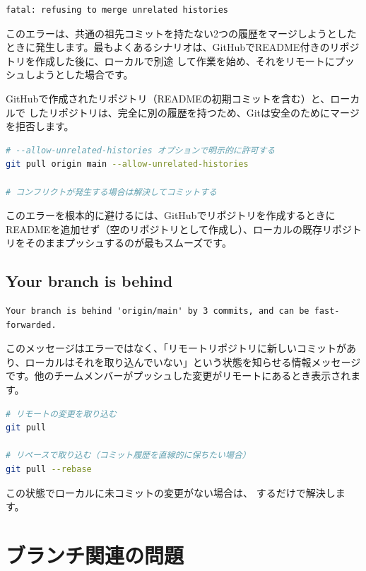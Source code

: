 \begin{lstlisting}[language={}]
fatal: refusing to merge unrelated histories
\end{lstlisting}

このエラーは、共通の祖先コミットを持たない2つの履歴をマージしようとしたときに発生します。最もよくあるシナリオは、GitHubでREADME付きのリポジトリを作成した後に、ローカルで別途  して作業を始め、それをリモートにプッシュしようとした場合です。

GitHubで作成されたリポジトリ（READMEの初期コミットを含む）と、ローカルで  したリポジトリは、完全に別の履歴を持つため、Gitは安全のためにマージを拒否します。

\begin{lstlisting}[language=bash]
# --allow-unrelated-histories オプションで明示的に許可する
git pull origin main --allow-unrelated-histories

# コンフリクトが発生する場合は解決してコミットする
\end{lstlisting}

このエラーを根本的に避けるには、GitHubでリポジトリを作成するときにREADMEを追加せず（空のリポジトリとして作成し）、ローカルの既存リポジトリをそのままプッシュするのが最もスムーズです。

\subsection{Your branch is behind}

\begin{lstlisting}[language={}]
Your branch is behind 'origin/main' by 3 commits, and can be fast-forwarded.
\end{lstlisting}

このメッセージはエラーではなく、「リモートリポジトリに新しいコミットがあり、ローカルはそれを取り込んでいない」という状態を知らせる情報メッセージです。他のチームメンバーがプッシュした変更がリモートにあるとき表示されます。

\begin{lstlisting}[language=bash]
# リモートの変更を取り込む
git pull

# リベースで取り込む（コミット履歴を直線的に保ちたい場合）
git pull --rebase
\end{lstlisting}

この状態でローカルに未コミットの変更がない場合は、 するだけで解決します。

\section{ブランチ関連の問題}

